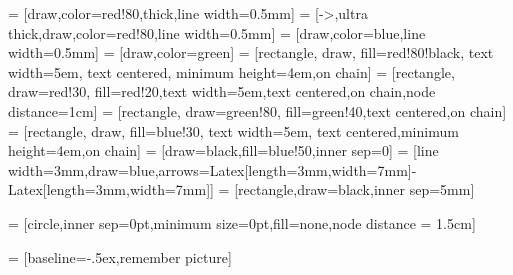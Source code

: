  = [draw,color=red!80,thick,line width=0.5mm]
 = [->,ultra thick,draw,color=red!80,line width=0.5mm]
 = [draw,color=blue,line width=0.5mm]
 = [draw,color=green]
 = [rectangle, draw, fill=red!80!black, text width=5em, text centered, minimum height=4em,on chain]
 = [rectangle, draw=red!30, fill=red!20,text width=5em,text centered,on chain,node distance=1cm]
 = [rectangle, draw=green!80, fill=green!40,text centered,on chain]
 = [rectangle, draw, fill=blue!30, text width=5em, text centered,minimum height=4em,on chain]
 = [draw=black,fill=blue!50,inner sep=0]
 = [line width=3mm,draw=blue,arrows={Latex[length=3mm,width=7mm]-Latex[length=3mm,width=7mm]}]
 = [rectangle,draw=black,inner sep=5mm]



 = [circle,inner sep=0pt,minimum size=0pt,fill=none,node distance = 1.5cm]

 = [baseline=-.5ex,remember picture]

\newcommand{\matlab}{MATLAB\xspace}

